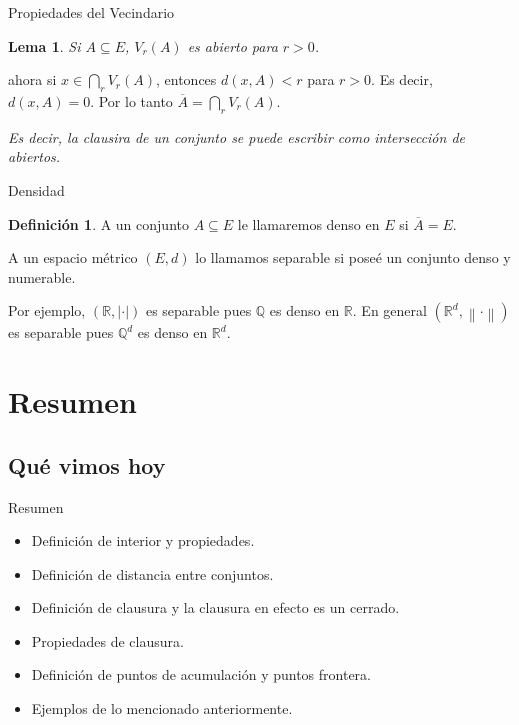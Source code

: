 \documentclass[utf8]{beamer}
\theoremstyle{plain}
\newtheorem{Lem}{Lema}                 %
\theoremstyle{definition}
\newtheorem{Def}{Definición}           %
\theoremstyle{remark}
\numberwithin{equation}{section}
\newcommand{\bQ}{\mathbb{Q}}    %
\newcommand{\bR}{\mathbb{R}}    %
\newcommand{\nm}[1]{\left\|#1\right\|} %
\newcommand{\ov}{\overline}
\begin{document}
\begin{frame}{Propiedades del Vecindario}
    \begin{Lem}
        Si $A\subseteq E$, $V_r(A)$ es abierto para $r>0$. 
    \end{Lem}

    ahora si $x\in \bigcap_rV_r(A)$, entonces $d(x,A)<r$ para $r>0$. Es decir, $d(x,A)=0$. Por lo tanto $\ov A=\bigcap_rV_r(A)$.\par 
    \emph{Es decir, la clausira de un conjunto se puede escribir como intersecci\'on de abiertos.}
\end{frame}

\begin{frame}{Densidad} %
    \begin{Def}
        A un conjunto $A\subseteq E$ le llamaremos \alert{denso} en $E$ si $\ov A=E$.\par
        A un espacio m\'etrico $(E,d)$ lo llamamos \alert{separable} si pose\'e un conjunto denso y numerable.
    \end{Def}
    
    Por ejemplo, $(\bR,|\cdot|)$ es separable pues $\bQ$ es denso en $\bR$. En general $(\bR^d,\nm{\cdot})$ es separable pues $\bQ^d$ es denso en $\bR^d$.
\end{frame}
\section*{Resumen}

\subsection*{Qu\'e vimos hoy}
\begin{frame}{Resumen}

  \begin{itemize}
  \item Definici\'on de interior y propiedades.
  \item Definición de distancia entre conjuntos.
  \item Definici\'on de clausura y la clausura en efecto es un cerrado.
  \item Propiedades de clausura.
  \item Definición de puntos de acumulaci\'on y puntos frontera.
  \item Ejemplos de lo mencionado anteriormente.
  \end{itemize}
  
\end{frame}
\end{document}

